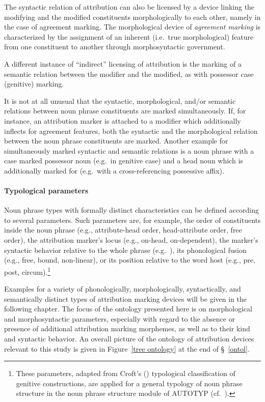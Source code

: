 The syntactic relation of attribution can also be licensed by a device linking the modifying and the modified constituents morphologically to each other, namely in the case of agreement marking. The morphological device of \emph{agreement marking} is characterized by the assignment of an inherent (i.e.~true morphological) feature from one constituent to another through morphosyntactic government.

A different instance of “indirect” licensing of attribution is the marking of a semantic relation between the modifier and the modified, as with possessor case (genitive) marking.

It is not at all unusual that the syntactic, morphological, and/or semantic relations between noun phrase constituents are marked simultaneously. If, for instance, an attribution marker is attached to a modifier which additionally inflects for agreement features, both the syntactic and the morphological relation between the noun phrase constituents are marked. Another example for simultaneously marked syntactic and semantic relations is a noun phrase with a case marked possessor noun (e.g.~in genitive case) and a head noun which is additionally marked for  (e.g.~with a cross-referencing possessive affix).

\paragraph{Typological parameters} 
Noun phrase types with formally distinct characteristics can be defined according to several parameters. Such parameters are, for example, the order of constituents inside the noun phrase (e.g., attribute-head order, head-attribute order, free order), the attribution marker's locus (e.g., on-head, on-dependent), the marker's syntactic behavior relative to the whole phrase (e.g.~), its phonological fusion (e.g., free, bound, non-linear), or its position relative to the word host (e.g., pre, post, circum).\footnote{These parameters, adapted from Croft's (\citeyear[93–94]{croft1995}) typological classification of genitive constructions, are applied for a general typology of noun phrase structure in the noun phrase structure module of AUTOTYP (cf.~\citealt{AUTOTYP-NP}).}

Examples for a variety of phonologically, morphologically, syntactically, and semantically distinct types of attribution marking devices will be given in the following chapter. The focus of the ontology presented here is on morphological and morphosyntactic parameters, especially with regard to the absence or presence of additional attribution marking morphemes, as well as to their kind and syntactic behavior. An overall picture of the ontology of attribution devices relevant to this study is given in Figure~\ref{tree ontology} at the end of \S~\ref{ontol}.

